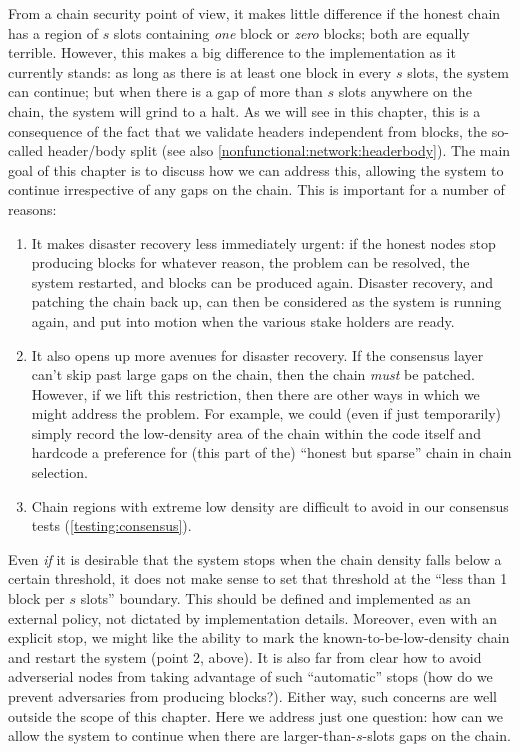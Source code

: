 From a chain security point of view, it makes little difference if the honest
chain has a region of $s$ slots containing \emph{one} block or \emph{zero}
blocks; both are equally terrible. However, this makes a big
difference to the implementation as it currently stands: as long as there is at
least one block in every $s$ slots, the system can continue; but when there is a
gap of more than $s$ slots anywhere on the chain, the system will grind to a
halt. As we will see in this chapter, this is a consequence of the fact that we
validate headers independent from blocks, the so-called header/body split
(see also \cref{nonfunctional:network:headerbody}). The main goal of this
chapter is to discuss how we can address this, allowing the system to continue
irrespective of any gaps on the chain. This is important for a number of
reasons:

\begin{enumerate}
\item It makes disaster recovery less immediately urgent: if the honest nodes
stop producing blocks for whatever reason, the problem can be resolved, the
system restarted, and blocks can be produced again. Disaster recovery,
and patching the chain back up, can then be considered as the system is running
again, and put into motion when the various stake holders are ready.
\item It also opens up more avenues for disaster recovery. If the consensus
layer can't skip past large gaps on the chain, then the chain \emph{must} be
patched. However, if we lift this restriction, then there are other ways in
which we might address the problem. For example, we could (even if just
temporarily) simply record the low-density area of the chain within the code
itself and hardcode a preference for (this part of the) ``honest but sparse''
chain in chain selection.
\item Chain regions with extreme low density are difficult to avoid
in our consensus tests (\cref{testing:consensus}).
\end{enumerate}

Even \emph{if} it is desirable that the system stops when the chain density
falls below a certain threshold, it does not make sense to set that threshold at
the ``less than 1 block per $s$ slots'' boundary. This should be defined and
implemented as an external policy, not dictated by implementation details.
Moreover, even with an explicit stop, we might like the ability to mark the
known-to-be-low-density chain and restart the system (point 2, above). It is
also far from clear how to avoid adverserial nodes from taking advantage of such
``automatic'' stops (how do we prevent adversaries from producing blocks?).
Either way, such concerns are well outside the scope of this chapter. Here we
address just one question: how can we allow the system to continue when there
are larger-than-$s$-slots gaps on the chain.

